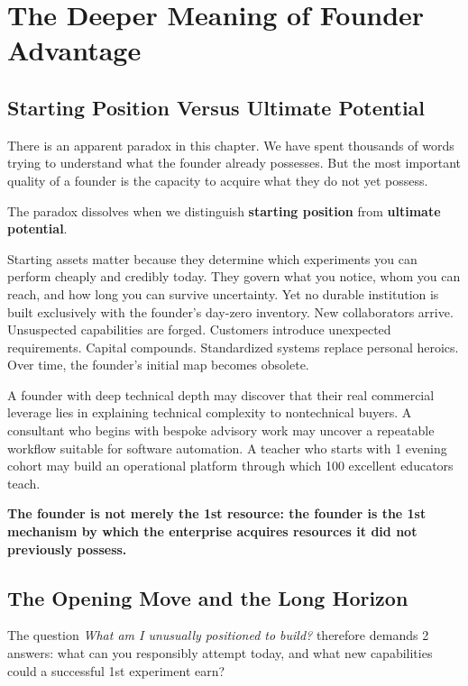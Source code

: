 \section{The Deeper Meaning of Founder Advantage}

\subsection{Starting Position Versus Ultimate Potential}

There is an apparent paradox in this chapter. We have spent thousands of words trying to understand what the founder already possesses. But the most important quality of a founder is the capacity to acquire what they do not yet possess.

The paradox dissolves when we distinguish \textbf{starting position} from \textbf{ultimate potential}.

Starting assets matter because they determine which experiments you can perform cheaply and credibly today. They govern what you notice, whom you can reach, and how long you can survive uncertainty. Yet no durable institution is built exclusively with the founder's day-zero inventory. New collaborators arrive. Unsuspected capabilities are forged. Customers introduce unexpected requirements. Capital compounds. Standardized systems replace personal heroics. Over time, the founder's initial map becomes obsolete.

A founder with deep technical depth may discover that their real commercial leverage lies in explaining technical complexity to nontechnical buyers. A consultant who begins with bespoke advisory work may uncover a repeatable workflow suitable for software automation. A teacher who starts with 1 evening cohort may build an operational platform through which 100 excellent educators teach.

\textbf{The founder is not merely the 1st resource: the founder is the 1st mechanism by which the enterprise acquires resources it did not previously possess.}

\subsection{The Opening Move and the Long Horizon}

The question \textit{What am I unusually positioned to build?} therefore demands 2 answers: what can you responsibly attempt today, and what new capabilities could a successful 1st experiment earn?

